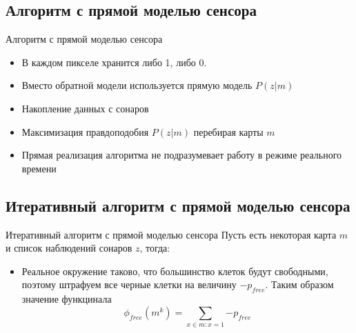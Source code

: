 \documentclass[9pt]{beamer}
\begin{document}
\subsection{Алгоритм с прямой моделью сенсора}
\begin{frame}{Алгоритм с прямой моделью сенсора}
\begin{itemize}
  \item
  {
    В каждом пикселе хранится либо 1, либо 0. 
  }
  \item
  {
    Вместо обратной модели используется прямую модель $P(z|m)$
  }
  \item
  {
    Накопление данных с сонаров
  }
  \item
  {
    Максимизация правдоподобия $P(z|m)$ перебирая карты $m$
  }
  \item
  {
    Прямая реализация алгоритма не подразумевает работу в режиме реального времени
  }
\end{itemize}
\end{frame}

\subsection{Итеративный алгоритм с прямой моделью сенсора}

\begin{frame}{Итеративный алгоритм с прямой моделью сенсора}
Пусть есть некоторая карта $m$ и список наблюдений сонаров $z$, тогда:
\begin{itemize}
  \item
  {
    Реальное окружение таково, что большинство клеток будут свободными, поэтому штрафуем все черные клетки на величину $-p_{free}$. Таким образом значение функцинала $$\phi_{free}(m^{k}) = \sum_{x \in m: x=1}{-p_{free}}$$
  }
\end{itemize}
\end{frame}
\end{document}
